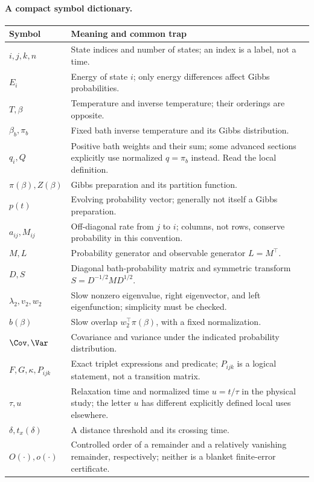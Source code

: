 \paragraph{A compact symbol dictionary.}
\begin{longtable}{>{\raggedright\arraybackslash}p{}>{\raggedright\arraybackslash}p{}}
\toprule Symbol & Meaning and common trap\\\midrule
\endhead
$i,j,k,n$ & State indices and number of states; an index is a label, not a time.\\
$E_i$ & Energy of state $i$; only energy differences affect Gibbs probabilities.\\
$T,\beta$ & Temperature and inverse temperature; their orderings are opposite.\\
$\beta_b,\pi_b$ & Fixed bath inverse temperature and its Gibbs distribution.\\
$q_i,Q$ & Positive bath weights and their sum; some advanced sections explicitly
use normalized $q=\pi_b$ instead. Read the local definition.\\
$\pi(\beta),Z(\beta)$ & Gibbs preparation and its partition function.\\
$p(t)$ & Evolving probability vector; generally not itself a Gibbs preparation.\\
$a_{ij},M_{ij}$ & Off-diagonal rate from $j$ to $i$; columns, not rows,
conserve probability in this convention.\\
$M,L$ & Probability generator and observable generator $L=M^\top$.\\
$D,S$ & Diagonal bath-probability matrix and symmetric transform
$S=D^{-1/2}MD^{1/2}$.\\
$\lambda_2,v_2,w_2$ & Slow nonzero eigenvalue, right eigenvector, and left
eigenfunction; simplicity must be checked.\\
$b(\beta)$ & Slow overlap $w_2^\top\pi(\beta)$, with a fixed normalization.\\
$\Cov,\Var$ & Covariance and variance under the indicated probability distribution.\\
$F,G,\kappa,P_{ijk}$ & Exact triplet expressions and predicate; $P_{ijk}$
is a logical statement, not a transition matrix.\\
$\tau,u$ & Relaxation time and normalized time $u=t/\tau$ in the physical study;
the letter $u$ has different explicitly defined local uses elsewhere.\\
$\delta,t_x(\delta)$ & A distance threshold and its crossing time.\\
$O(\cdot),o(\cdot)$ & Controlled order of a remainder and a relatively vanishing
remainder, respectively; neither is a blanket finite-error certificate.\\
\bottomrule
\end{longtable}

